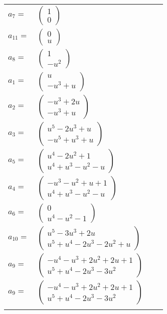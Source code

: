 \documentclass[1p]{elsarticle_modified}
\theoremstyle{definition}
\begin{document}
\begin{tabular}{m{7pt} m{180pt} m{7pt} m{180pt} }
\flushright $a_{7}=$&$\begin{pmatrix}1\\0\end{pmatrix}$ \\
\flushright $a_{11}=$&$\begin{pmatrix}0\\u\end{pmatrix}$ \\
\flushright $a_{8}=$&$\begin{pmatrix}1\\- u^2\end{pmatrix}$ \\
\flushright $a_{1}=$&$\begin{pmatrix}u\\- u^3+u\end{pmatrix}$ \\
\flushright $a_{2}=$&$\begin{pmatrix}- u^3+2 u\\- u^3+u\end{pmatrix}$ \\
\flushright $a_{3}=$&$\begin{pmatrix}u^5-2 u^3+u\\- u^5+u^3+u\end{pmatrix}$ \\
\flushright $a_{5}=$&$\begin{pmatrix}u^4-2 u^2+1\\u^4+u^3- u^2- u\end{pmatrix}$ \\
\flushright $a_{4}=$&$\begin{pmatrix}- u^3- u^2+u+1\\u^4+u^3- u^2- u\end{pmatrix}$ \\
\flushright $a_{6}=$&$\begin{pmatrix}0\\u^4- u^2-1\end{pmatrix}$ \\
\flushright $a_{10}=$&$\begin{pmatrix}u^5-3 u^3+2 u\\u^5+u^4-2 u^3-2 u^2+u\end{pmatrix}$ \\
\flushright $a_{9}=$&$\begin{pmatrix}- u^4- u^3+2 u^2+2 u+1\\u^5+u^4-2 u^3-3 u^2\end{pmatrix}$\\ \flushright $a_{9}=$&$\begin{pmatrix}- u^4- u^3+2 u^2+2 u+1\\u^5+u^4-2 u^3-3 u^2\end{pmatrix}$\\&\end{tabular}
\end{document}
